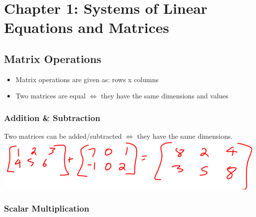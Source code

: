 \documentclass[
  letterpaper,
  DIV=11,
  numbers=noendperiod]{scrartcl}
\author{}
\date{}
\providecommand{\tightlist}{%
  \setlength{\itemsep}{0pt}\setlength{\parskip}{0pt}}\usepackage{longtable,booktabs,array}
\renewcommand*\contentsname{Table of contents}
\newcommand\contentsname{Table of contents}
\begin{document}

\newpage

\ifdefined\Shaded\renewenvironment{Shaded}{\begin{tcolorbox}[enhanced, interior hidden, boxrule=0pt, breakable, borderline west={3pt}{0pt}{shadecolor}, frame hidden, sharp corners]}{\end{tcolorbox}}\fi

\renewcommand*\contentsname{Table of Contents}
{
\hypersetup{linkcolor=}
\setcounter{tocdepth}{4}
\tableofcontents
}
\newpage{}

\hypertarget{chapter-1-systems-of-linear-equations-and-matrices}{%
\section{Chapter 1: Systems of Linear Equations and
Matrices}\label{chapter-1-systems-of-linear-equations-and-matrices}}

\hypertarget{matrix-operations}{%
\subsection{Matrix Operations}\label{matrix-operations}}

\begin{itemize}
\tightlist
\item
  Matrix operations are given as: rows x columns
\item
  Two matrices are equal \(\iff\) they have the same dimensions and
  values
\end{itemize}

\hypertarget{addition-subtraction}{%
\subsubsection{Addition \& Subtraction}\label{addition-subtraction}}

Two matrices can be added/subtracted \(\iff\) they have the same
dimensions. \includegraphics{img/addition-subtraction.png}

\hypertarget{scalar-multiplication}{%
\subsubsection{Scalar Multiplication}\label{scalar-multiplication}}
\end{document}
